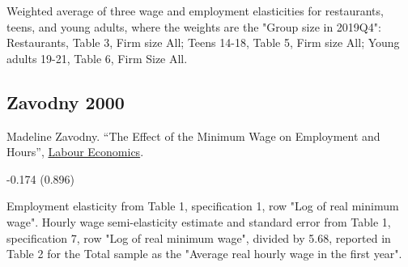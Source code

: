  Weighted average of three wage and employment elasticities for restaurants, teens, and young adults, where the weights are the "Group size in 2019Q4": Restaurants, Table 3, Firm size All; Teens 14-18, Table 5, Firm size All; Young adults 19-21, Table 6, Firm Size All.

\subsection*{Zavodny 2000}
\vspace{-0.7em}

\noindent Madeline Zavodny. ``The Effect of the Minimum Wage on Employment and Hours'', \href{https://doi.org/10.1016/S0927-5371(00)00021-X}{Labour Economics}.

\vspace{0.7em}

 -0.174 (0.896)

\vspace{0.7em}

 Employment elasticity from Table 1, specification 1, row "Log of real minimum wage". Hourly wage semi-elasticity estimate and standard error from Table 1, specification 7, row "Log of real minimum wage", divided by 5.68, reported in Table 2 for the Total sample as the "Average real hourly wage in the first year".

